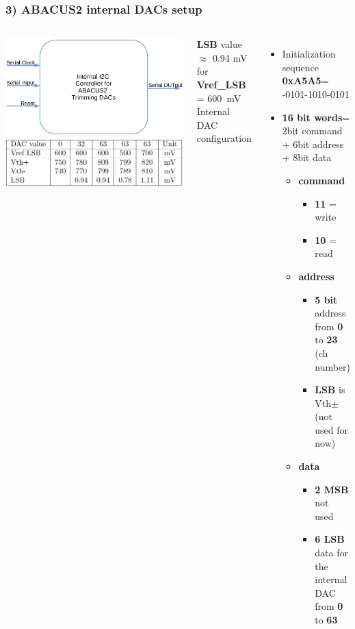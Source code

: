 \documentclass[aspectratio=169]{beamer}
\begin{document}
	\begin{frame}
		\frametitle{3) ABACUS2 internal DACs setup}	
		\begin{columns}
			\begin{center}
				\includegraphics[width=0.7 \textwidth]{IMG2/INTERNALDAC}
				\includegraphics[width=0.7 \textwidth]{IMG/TableLSB.PNG}
			\end{center}
			\textbf{LSB} value $\approx$ 0.94 mV for \textbf{Vref\_LSB} = 600~mV
			{\color{blue} Internal DAC configuration}
			\begin{itemize}
				\item Initialization sequence \textbf{0xA5A5}= 
				-0101-1010-0101
				\item \textbf{16 bit words}= \newline 2bit command + 6bit address + 8bit data
				\begin{itemize}
					\item \textbf{command}
					\begin{itemize}
						\item \textbf{11} = write
						\item \textbf{10} = read
					\end{itemize}
					\item \textbf{address}
					\begin{itemize}
						\item \textbf{5 bit} address from \textbf{0} to \textbf{23} (ch number)
						\item \textbf{LSB} is Vth$\pm$ (not used for now)
					\end{itemize}
					\item \textbf{data}
					\begin{itemize}
						\item \textbf{2 MSB} not used
						\item \textbf{6 LSB} data for the internal DAC \newline from \textbf{0} to \textbf{63}
					\end{itemize}
				\end{itemize} 
			\end{itemize}
		\end{columns}
	\end{frame}
\end{document}
